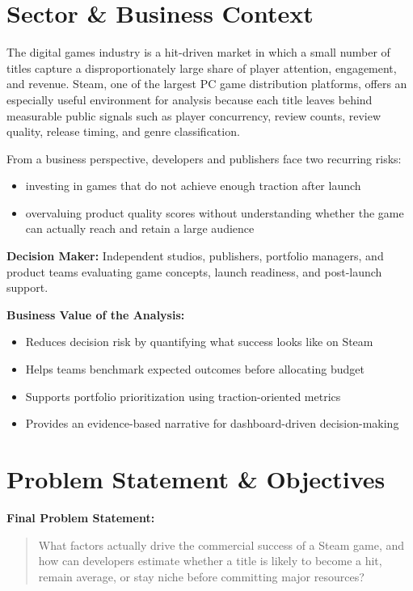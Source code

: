 \documentclass[12pt,a4paper]{report}
\begin{document}
\newpage

\chapter{Sector \& Business Context}

The digital games industry is a hit-driven market in which a small number of titles capture a disproportionately large share of player attention, engagement, and revenue. Steam, one of the largest PC game distribution platforms, offers an especially useful environment for analysis because each title leaves behind measurable public signals such as player concurrency, review counts, review quality, release timing, and genre classification.

From a business perspective, developers and publishers face two recurring risks:
\begin{itemize}
\item investing in games that do not achieve enough traction after launch
\item overvaluing product quality scores without understanding whether the game can actually reach and retain a large audience
\end{itemize}

\textbf{Decision Maker:} Independent studios, publishers, portfolio managers, and product teams evaluating game concepts, launch readiness, and post-launch support.

\textbf{Business Value of the Analysis:}
\begin{itemize}
\item Reduces decision risk by quantifying what success looks like on Steam
\item Helps teams benchmark expected outcomes before allocating budget
\item Supports portfolio prioritization using traction-oriented metrics
\item Provides an evidence-based narrative for dashboard-driven decision-making
\end{itemize}

\chapter{Problem Statement \& Objectives}

\textbf{Final Problem Statement:}

\begin{quote}
What factors actually drive the commercial success of a Steam game, and how can developers estimate whether a title is likely to become a hit, remain average, or stay niche before committing major resources?
\end{quote}
\end{document}
